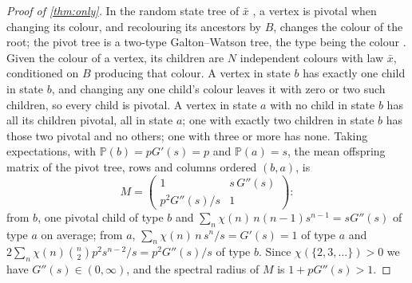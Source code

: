 \documentclass[11pt]{amsart}
\theoremstyle{remark}
\begin{document}
\begin{proof}[Proof of \cref{thm:only}]
In the random state tree of $\bar x$ \cite[Section~1.6]{JPS}, a vertex is pivotal when changing its colour, and recolouring its ancestors by $B$, changes the colour of the root; the pivot tree is a two-type Galton--Watson tree, the type being the colour \cite[Proposition~2.4]{JPS}. Given the colour of a vertex, its children are $N$ independent colours with law $\bar x$, conditioned on $B$ producing that colour. A vertex in state $b$ has exactly one child in state $b$, and changing any one child's colour leaves it with zero or two such children, so every child is pivotal. A vertex in state $a$ with no child in state $b$ has all its children pivotal, all in state $a$; one with exactly two children in state $b$ has those two pivotal and no others; one with three or more has none. Taking expectations, with $\mathbb P(b)=pG'(s)=p$ and $\mathbb P(a)=s$, the mean offspring matrix of the pivot tree, rows and columns ordered $(b,a)$, is
\[
M=\begin{pmatrix} 1 & s\,G''(s)\\ p^2G''(s)/s & 1\end{pmatrix}:
\]
from $b$, one pivotal child of type $b$ and $\sum_n\chi(n)\,n(n-1)s^{n-1}=sG''(s)$ of type $a$ on average; from $a$, $\sum_n\chi(n)\,n\,s^n/s=G'(s)=1$ of type $a$ and $2\sum_n\chi(n)\binom n2p^2s^{n-2}/s=p^2G''(s)/s$ of type $b$. Since $\chi(\{2,3,\dots\})>0$ we have $G''(s)\in(0,\infty)$, and the spectral radius of $M$ is $1+pG''(s)>1$.
\end{proof}
\end{document}
